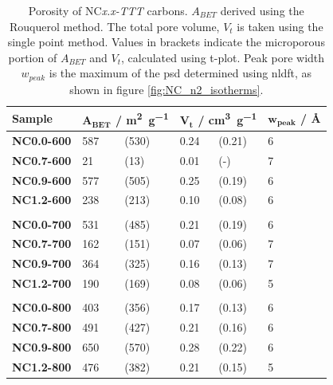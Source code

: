 \begin{table}[ht!]
    \caption{Porosity of NC\textit{x.x-TTT} carbons. $A_{BET}$ derived using the Rouquerol method. The total pore volume, $V_t$ is taken using the single point method. Values in brackets indicate the microporous portion of $A_{BET}$ and $V_t$, calculated using t-plot. Peak pore width $w_{peak}$ is the maximum of the \acrshort{psd} determined using \acrshort{nldft}, as shown in figure \ref{fig:NC_n2_isotherms}.}
    \label{tb:nc_porosity}
    \begin{tabularx}{\textwidth}{Xllllll}
    \toprule
        \textbf{Sample} & \multicolumn{2}{l}{$\mathbf{A_{BET}}$ \textbf{/ \unit[detect-weight]{\metre\squared\per\gram}}}  & \multicolumn{2}{l}{$\mathbf{V_t}$ \textbf{/ \unit[detect-weight]{\cm\cubed\per\gram}}} & \multicolumn{2}{l}{$\mathbf{w_{peak}}$ \textbf{/ \unit{\angstrom}}} \\
    \midrule
        \textbf{NC0.0-600} & 587 & (530) & 0.24 & (0.21) & 6 \\
        \textbf{NC0.7-600} & 21 & (13) & 0.01 & (-) & 7 \\
        \textbf{NC0.9-600} & 577 & (505) & 0.25 & (0.19) & 6 \\
        \textbf{NC1.2-600} & 238 & (213) & 0.10 & (0.08) & 6 \\
        \\
        \textbf{NC0.0-700} & 531 & (485) & 0.21 & (0.19) & 6 \\
        \textbf{NC0.7-700} & 162 & (151) & 0.07 & (0.06) & 7 \\
        \textbf{NC0.9-700} & 364 & (325) & 0.16 & (0.13) & 7 \\
        \textbf{NC1.2-700} & 190 & (169) & 0.08 & (0.06) & 5 \\
        \\
        \textbf{NC0.0-800} & 403 & (356) & 0.17 & (0.13) & 6 \\
        \textbf{NC0.7-800} & 491 & (427) & 0.21 & (0.16) & 6 \\
        \textbf{NC0.9-800} & 650 & (570) & 0.28 & (0.22) & 6 \\
        \textbf{NC1.2-800} & 476 & (382) & 0.21 & (0.15) & 5 \\
    \bottomrule
    \end{tabularx}
\end{table}


